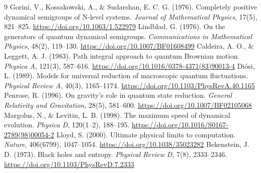 \documentclass[11pt,a4paper]{article}
\begin{document}
\begin{thebibliography}{9}
 Gorini, V., Kossakowski, A., \& Sudarshan, E. C. G. (1976). Completely positive dynamical semigroups of N-level systems. \textit{Journal of Mathematical Physics}, 17(5), 821--825. \url{https://doi.org/10.1063/1.522979}
 Lindblad, G. (1976). On the generators of quantum dynamical semigroups. \textit{Communications in Mathematical Physics}, 48(2), 119--130. \url{https://doi.org/10.1007/BF01608499}
 Caldeira, A. O., \& Leggett, A. J. (1983). Path integral approach to quantum Brownian motion. \textit{Physica A}, 121(3), 587--616. \url{https://doi.org/10.1016/0378-4371(83)90013-4}
 Di\'{o}si, L. (1989). Models for universal reduction of macroscopic quantum fluctuations. \textit{Physical Review A}, 40(3), 1165--1174. \url{https://doi.org/10.1103/PhysRevA.40.1165}
 Penrose, R. (1996). On gravity's role in quantum state reduction. \textit{General Relativity and Gravitation}, 28(5), 581--600. \url{https://doi.org/10.1007/BF02105068}
 Margolus, N., \& Levitin, L. B. (1998). The maximum speed of dynamical evolution. \textit{Physica D}, 120(1--2), 188--195. \url{https://doi.org/10.1016/S0167-2789(98)00054-2}
 Lloyd, S. (2000). Ultimate physical limits to computation. \textit{Nature}, 406(6799), 1047--1054. \url{https://doi.org/10.1038/35023282}
 Bekenstein, J. D. (1973). Black holes and entropy. \textit{Physical Review D}, 7(8), 2333--2346. \url{https://doi.org/10.1103/PhysRevD.7.2333}
\end{thebibliography}
\end{document}
